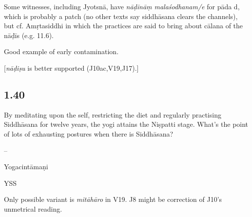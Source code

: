 \begin{ekdosis}
\begin{philcomm}[hp01_039]
Some witnesses, including Jyotsnā, have \emph{nāḍīnāṃ malaśodhanam/e} for pāda d, which is probably a patch (no other texts say siddhāsana clears the channels), but cf. Amṛtasiddhi in which the practices are said to bring about cālana of the nāḍīs (e.g. 11.6).

Good example of early contamination.

[\emph{nāḍiṣu} is better supported (J10ac,V19,J17).]
\end{philcomm}

\subsection*{1.40}
\begin{translation}[hp01_040]
By meditating upon the self, restricting the diet and regularly practising Siddhāsana for twelve years, the yogi attains the Niṣpatti stage.
What’s the point of lots of exhausting postures when there is Siddhāsana?
\end{translation}

\begin{sources}[hp01_040]
--
\end{sources}

\begin{testimonia}[hp01_040]
Yogacintāmaṇi

\begin{versinnote}
\end{versinnote}

YSS

\begin{versinnote}
\end{versinnote}

\end{testimonia}

\begin{philcomm}[hp01_040]
Only possible variant is \emph{mitāhāro} in V19.
J8 might be correction of J10’s unmetrical reading.


\end{philcomm}
\end{ekdosis}
